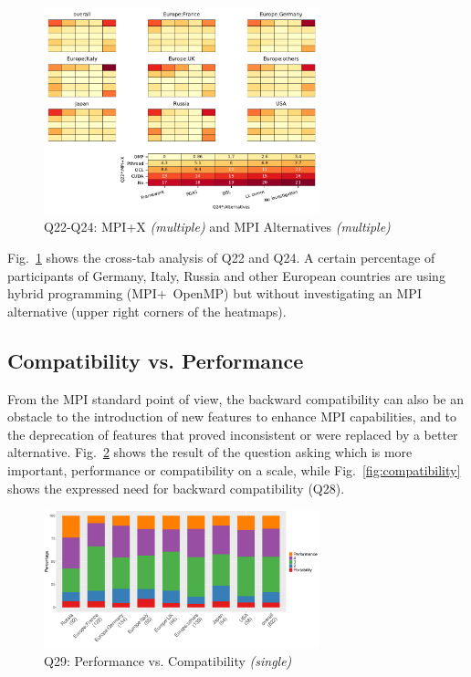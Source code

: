 \documentclass[preprint,5p,times]{elsarticle}
\newcommand{\revision}[2]{{\color{blue}#2}}
\begin{document}
\begin{figure}[tb]
\begin{center}
\includegraphics[width=8.0cm]{Figs/Q22-Q24.pdf}
\caption{Q22-Q24: MPI+X {\it(multiple)} and MPI Alternatives {\it(multiple)}}
\label{fig:mpi-x-and-alternatives}
\end{center}
\end{figure}

Fig.~\ref{fig:mpi-x-and-alternatives} shows the cross-tab analysis of Q22 and
Q24. A certain percentage of participants of Germany, Italy, Russia and other
European countries are using hybrid programming (MPI+\ OpenMP) but without
investigating \revision{the}{an} MPI alternative (upper right corners of the heatmaps).

\subsection{Compatibility vs. Performance}

\revision{In the history of MPI, portability, which translates into maintaining backward
compatibility across versions, has been of paramount importance. From the MPI
standard point of view it}{From the MPI
standard point of view, the backward compatibility} can also be an
obstacle to the introduction of new 
features to enhance MPI capabilities, and to the deprecation of features that
proved inconsistent or were replaced by \revision{}{a} better alternative.
Fig.~\ref{fig:performance-vs-compatibility} shows the result of the question
asking which is more important, performance or compatibility on a scale, while
Fig.~\ref{fig:compatibility} shows the expressed need for backward compatibility
(Q28).

\begin{figure}[tb]
\begin{center}
\includegraphics[width=8.0cm]{R-scripts/Q29.pdf}
\vspace{-2mm}
\caption{Q29: Performance vs. Compatibility {\it(single)}}
\label{fig:performance-vs-compatibility}
\end{center}
\end{figure}
\end{document}
